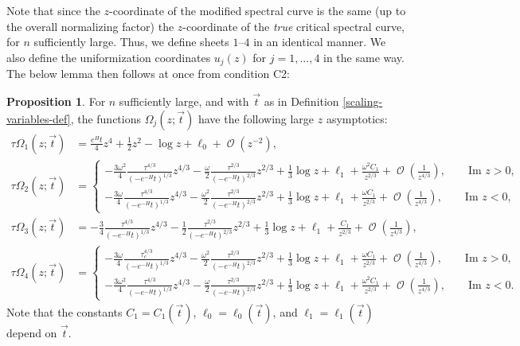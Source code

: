 \documentclass[usenames,dvipsnames]{article}
\theoremstyle{definition}
\newtheorem{prop}{Proposition}[section]
\DeclareMathOperator{\OO}{\mathcal{O}}
\numberwithin{equation}{section}
\numberwithin{figure}{section}
\begin{document}
Note that since the $z$-coordinate of the modified spectral curve is the same (up to the overall normalizing factor) the $z$-coordinate of the \textit{true} critical
spectral curve, for $n$ sufficiently large. Thus, we define sheets $1$--$4$ in an identical manner. We also define
the uniformization coordinates $u_j(z)$ for $j=1,...,4$ in the same way. The below lemma then follows at once from condition C2:
\begin{prop}
For $n$ sufficiently large, and with $\vec{t}$ as in Definition \ref{scaling-variables-def}, the functions $\Omega_j(z;\vec{t})$ have the following large $z$ asymptotics:
        \begin{align}
            \tau \Omega_1(z;\vec{t}) &= \frac{e^{H}t}{4}z^4 + \frac{1}{2}z^2 - \log z + \ell_0 + \OO(z^{-2}),\label{modified-omega-1-asymptotic}\\
            \tau \Omega_{2}(z;\vec{t}) &= \begin{cases}
                -\frac{3\omega^2}{4}\frac{\tau^{4/3}}{(-e^{-H}t)^{1/3}}z^{4/3} - \frac{\omega}{2} \frac{\tau^{2/3}}{(-e^{-H}t)^{2/3}} z^{2/3} + \frac{1}{3}\log z + \ell_1 + \frac{\omega^2 C_1}{z^{2/3}} +  \OO\left(\frac{1}{z^{4/3}}\right), \qquad \text{Im } z > 0, \\
                -\frac{3\omega}{4}\frac{\tau^{4/3}}{(-e^{-H}t)^{1/3}}z^{4/3} - \frac{\omega^2}{2} \frac{\tau^{2/3}}{(-e^{-H}t)^{2/3}} z^{2/3} + \frac{1}{3}\log z + \ell_1 + \frac{\omega C_1}{z^{2/3}} +  \OO\left(\frac{1}{z^{4/3}}\right), \qquad \text{Im } z < 0,
                    \end{cases}\\
                \tau \Omega_{3}(z;\vec{t}) &= -\frac{3}{4}\frac{\tau^{4/3}}{(-e^{-H}t)^{1/3}}z^{4/3} - \frac{1}{2} \frac{\tau^{2/3}}{(-e^{-H}t)^{2/3}} z^{2/3} + \frac{1}{3}\log z + \ell_1 + \frac{C_1}{z^{2/3}} +  \OO\left(\frac{1}{z^{4/3}}\right),\\
                \tau \Omega_{4}(z;\vec{t}) &= \begin{cases}
                -\frac{3\omega}{4}\frac{\tau_c^{4/3}}{(-e^{-H}t)^{1/3}}z^{4/3} - \frac{\omega^2}{2} \frac{\tau^{2/3}}{(-e^{-H}t)^{2/3}} z^{2/3} + \frac{1}{3}\log z + \ell_1 + \frac{\omega C_1}{z^{2/3}} +  \OO\left(\frac{1}{z^{4/3}}\right), \qquad \text{Im } z > 0, \label{modified-omega-4-asymptotic}\\
                -\frac{3\omega^2}{4}\frac{\tau^{4/3}}{(-e^{-H}t)^{1/3}}z^{4/3} - \frac{\omega}{2} \frac{\tau^{2/3}}{(-e^{-H}t)^{2/3}} z^{2/3} + \frac{1}{3}\log z + \ell_1 + \frac{\omega^2 C_1}{z^{2/3}} +  \OO\left(\frac{1}{z^{4/3}}\right),\qquad \text{Im } z < 0.
                    \end{cases}
        \end{align}
        Note that the constants $C_1 = C_1(\vec{t})$, $\ell_0 = \ell_0(\vec{t})$, and $\ell_1 = \ell_1(\vec{t})$ depend on $\vec{t}$.
\end{prop}
\end{document}
